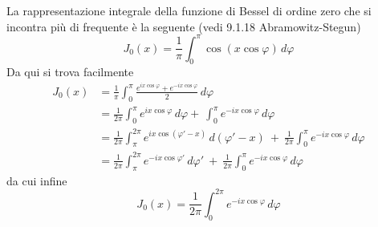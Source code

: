La rappresentazione integrale della funzione di Bessel di ordine zero che si incontra più di frequente è la seguente
(vedi 9.1.18 Abramowitz-Stegun\cite{AbramSteg})
\[
J_{0}(x) = \frac{1}{\pi} \int_{0}^{\pi} \cos(x \cos \varphi) \, d\varphi
\]
Da qui si trova facilmente
\begin{align*}
    J_{0}(x) &= \frac{1}{\pi} \int_{0}^{\pi} \frac{e^{ ix\cos \varphi }+e^{ -ix\cos \varphi }}{2} \, d\varphi \\
    &= \frac{1}{2\pi} \int_{0}^{\pi} e^{ ix\cos \varphi }  \, d\varphi + \ \int_{0}^{\pi}e^{ -ix\cos \varphi } \, d\varphi  \\
    &= \frac{1}{2\pi} \int_{\pi}^{2\pi}e^{ ix \cos (\varphi'-x) } \, d(\varphi'-x) \ + \ \frac{1}{2\pi} \int_{0}^{\pi} e^{ -ix\cos \varphi }\, d\varphi \\
    & =\frac{1}{2\pi} \int_{\pi}^{2\pi}e^{ -ix \cos \varphi' } \, d\varphi' \ + \ \frac{1}{2\pi} \int_{0}^{\pi} e^{ -ix\cos \varphi }\, d\varphi
\end{align*}
da cui infine
\[
J_{0}(x) = \frac{1}{2\pi} \int_{0}^{2 \pi} e^{ -ix \cos \varphi }\, d\varphi
\]


